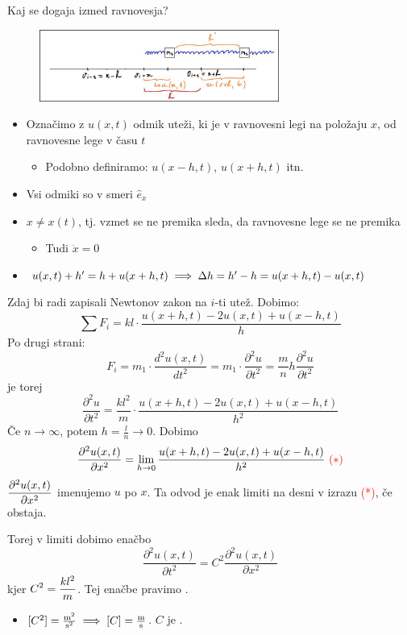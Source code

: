 Kaj se dogaja izmed ravnovesja?
\begin{figure}[h!]
    \centering
    \includegraphics[width=0.7\textwidth]{img/01_009.jpg}  
\end{figure}
\begin{itemize}
    \item Označimo z \(u(x, t)\) odmik uteži, ki je v ravnovesni legi na položaju \(x\), od ravnovesne lege v času \(t\)
    \begin{itemize}
        \item Podobno definiramo: \(u(x - h, t)\), \(u(x + h, t)\) itn.
    \end{itemize}
    \item Vsi odmiki so v smeri \(\hat{e}_x\)
    \item \(x \neq x(t)\), tj. vzmet se ne premika sleda, da ravnovesne lege se ne premika
    \begin{itemize}
        \item Tudi \(\dot{x} = 0\)
    \end{itemize}
    \item \(u(x, t) + h' = h + u(x+h, t) \implies \Delta h = h' - h  = u(x + h, t) - u(x, t)\)
\end{itemize}
%
Zdaj bi radi zapisali Newtonov zakon na \(i\)-ti utež. Dobimo:
\[
\sum F_i = kl \cdot  \frac{u(x+h, t) - 2u(x, t) + u(x -h, t)}{h}
\]
%
Po drugi strani:
\[
F_i = m_1 \cdot \frac{d^2u(x, t)}{dt^2} = m_1 \cdot \frac{\partial^2 u}{\partial t^2} = \frac{m}{n}h \frac{\partial^2 u}{\partial t^2}
\]
%
 je torej
%
\[
    \frac{\partial^2 u}{\partial t^2} = \frac{kl^2}{m} \cdot \frac{u(x+h, t) - 2u(x, t) + u(x -h, t)}{h^2}
\]
\newpage
%
Če \(n \to \infty\), potem \(h = \frac{l}{n} \to 0\). Dobimo 
%
\[
\frac{\partial^2u(x,t)}{\partial x^2} = \lim_{h \to 0} \frac{u(x+h, t) - 2u(x, t) + u(x -h, t)}{h^2} \ \textcolor{red}{(*)}
\]
%
\(\displaystyle \frac{\partial^2u(x,t)}{\partial x^2}\) imenujemo  \(u\) po \(x\). Ta odvod je enak limiti na desni v izrazu \textcolor{red}{(*)}, če obstaja.

Torej v limiti dobimo enačbo
%
\[
    \boxed{\frac{\partial^2 u(x, t)}{\partial t^2} = C^2 \frac{\partial^2u(x,t)}{\partial x^2}}
\]
%
kjer \(\displaystyle C^2 = \frac{kl^2}{m}\). Tej enačbe pravimo .
\begin{itemize}
    \item \([C^2] = \frac{\text{m}^2}{\text{s}^2} \implies [C] = \frac{\text{m}}{\text{s}}\). \(C\) je .
\end{itemize}

